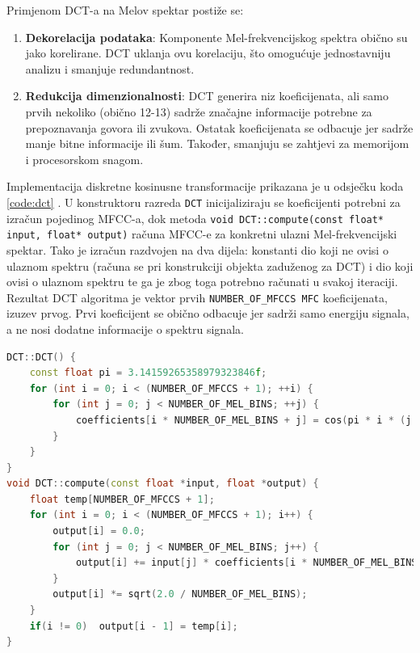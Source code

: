 Primjenom DCT-a na Melov spektar postiže se:

\begin{enumerate}
\item \textbf{Dekorelacija podataka}: Komponente Mel-frekvencijskog spektra obično su jako 
korelirane. DCT uklanja ovu korelaciju, što omogućuje jednostavniju analizu i smanjuje
redundantnost.

\item \textbf{Redukcija dimenzionalnosti}: DCT generira niz koeficijenata, ali samo prvih
nekoliko (obično 12-13) sadrže značajne informacije potrebne za prepoznavanja govora ili zvukova. 
Ostatak koeficijenata se odbacuje jer sadrže manje bitne informacije ili šum. Također,
smanjuju se zahtjevi za memorijom i procesorskom snagom.
\end{enumerate}

Implementacija diskretne kosinusne transformacije prikazana je u odsječku koda \ref{code:dct} .
U konstruktoru razreda \texttt{DCT} inicijaliziraju se koeficijenti potrebni za izračun pojedinog MFCC-a,
dok metoda \texttt{void DCT::compute(const float* input, float* output)} 
računa MFCC-e za konkretni ulazni Mel-frekvencijski spektar. Tako je izračun
razdvojen na dva dijela: konstanti dio koji ne ovisi o ulaznom spektru (računa
se pri konstrukciji objekta zaduženog za DCT) i dio koji
ovisi o ulaznom spektru te ga je zbog toga potrebno računati u svakoj iteraciji.
Rezultat DCT algoritma je vektor prvih \texttt{NUMBER\_OF\_MFCCS MFC} koeficijenata, izuzev
prvog. Prvi koeficijent se obično odbacuje jer sadrži samo energiju signala, a ne nosi
dodatne informacije o spektru signala.

\newpage
\begin{lstlisting}[language=C++, caption=Diskretna kosinusna transformacija, label=code:dct]
DCT::DCT() {
    const float pi = 3.14159265358979323846f;
    for (int i = 0; i < (NUMBER_OF_MFCCS + 1); ++i) {
        for (int j = 0; j < NUMBER_OF_MEL_BINS; ++j) {
            coefficients[i * NUMBER_OF_MEL_BINS + j] = cos(pi * i * (j + 0.5f) / NUMBER_OF_MEL_BINS);
        }
    }
}
void DCT::compute(const float *input, float *output) {
    float temp[NUMBER_OF_MFCCS + 1];
    for (int i = 0; i < (NUMBER_OF_MFCCS + 1); i++) {
        output[i] = 0.0;
        for (int j = 0; j < NUMBER_OF_MEL_BINS; j++) {
            output[i] += input[j] * coefficients[i * NUMBER_OF_MEL_BINS + j];
        }
        output[i] *= sqrt(2.0 / NUMBER_OF_MEL_BINS);
    }
    if(i != 0)  output[i - 1] = temp[i];
}
\end{lstlisting}

